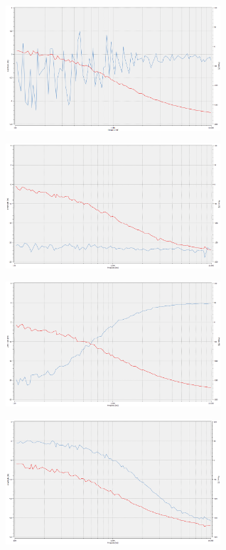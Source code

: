 \begin{figure}[h]
\centering
\begin{subfigure}{.5\textwidth}
  \centering
  \includegraphics[width=8cm]{pics/0_0Steckbrett}
  \label{0_0SB}
\end{subfigure}%
\begin{subfigure}{.5\textwidth}
  \centering
  \includegraphics[width=8cm]{pics/100_100Steckbrett}
  \label{1_1SB}
\end{subfigure}
\begin{subfigure}{.5\textwidth}
  \centering
  \includegraphics[width=8cm]{pics/0_100Steckbrett}
  \label{0_1SB}
\end{subfigure}%
\begin{subfigure}{.5\textwidth}
  \centering
  \includegraphics[width=8cm]{pics/100_0Steckbrett}

\end{subfigure}
\end{figure}
